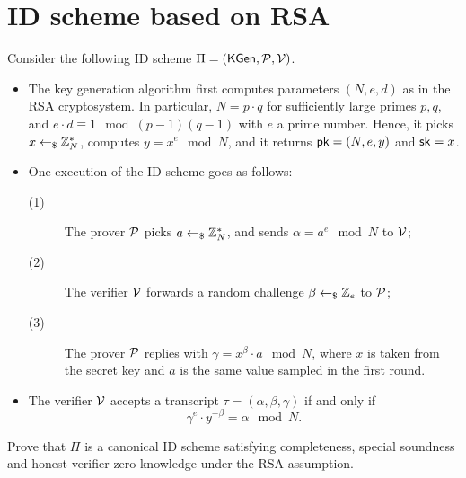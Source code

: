 \section{ID scheme based on RSA}

Consider the following ID scheme $\Pi = (\mathsf{KGen}, \mathcal{P}, \mathcal{V})$.

\begin{itemize}
    \item The key generation algorithm first computes parameters $(N, e, d)$ as in the RSA cryptosystem. In particular, $N = p \cdot q$ for sufficiently large primes $p, q$, and $e \cdot d \equiv 1 \mod (p - 1)(q - 1)$ with $e$ a prime number. Hence, it picks $x \leftarrow_\$ \mathbb Z_N^*$, computes $y = x^e \mod N$, and it returns $\mathsf{pk} = (N, e, y)$ and $\mathsf{sk} = x$.
    \item One execution of the ID scheme goes as follows:
          \begin{description}
              \item[(1)] The prover $\mathcal{P}$ picks $a \leftarrow_\$ \mathbb Z_N^*$, and  sends $\alpha = a^e \mod N$ to $\mathcal{V}$;
              \item[(2)] The verifier $\mathcal{V}$ forwards a random challenge $\beta \leftarrow_\$ \mathbb Z_e$ to $\mathcal{P}$;
              \item[(3)] The prover $\mathcal{P}$ replies with $\gamma = x^\beta \cdot a \mod N$, where $x$ is taken from the secret key and $a$ is the same value sampled in the first round.
          \end{description}
    \item The verifier $\mathcal{V}$ accepts a transcript $\tau = (\alpha, \beta, \gamma)$ if and only if \[\gamma^e \cdot y^{-\beta} = \alpha \mod N.\]
\end{itemize}

Prove that $\Pi$ is a canonical ID scheme satisfying completeness, special soundness and honest-verifier zero knowledge under the RSA assumption.

\solution{
}

